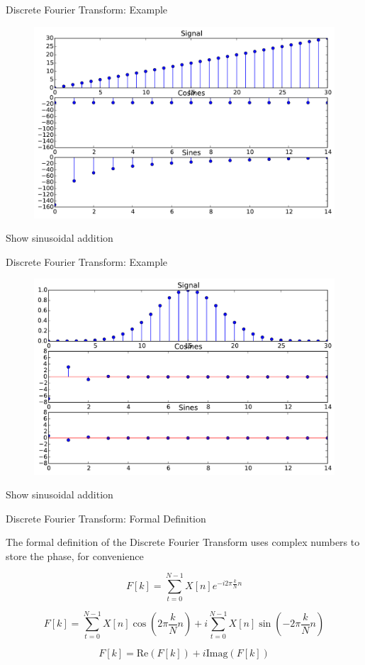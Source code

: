 \documentclass{beamer}
\begin{document}
\begin{frame}{Discrete Fourier Transform: Example}

\begin{figure}[t]
    \includegraphics[width=\textwidth]{SawtoothWave.pdf}
\end{figure}

Show sinusoidal addition

\end{frame}

\begin{frame}{Discrete Fourier Transform: Example}

\begin{figure}[t]
    \includegraphics[width=\textwidth]{GaussianBump.pdf}
\end{figure}

Show sinusoidal addition
\end{frame}

\begin{frame}{Discrete Fourier Transform: Formal Definition}

The formal definition of the Discrete Fourier Transform uses complex numbers to store the phase, for convenience

\[ F[k] = \sum_{t = 0}^{N-1} X[n] e^{ -i 2 \pi \frac{k}{N} n } \]

\[ F[k] = \sum_{t = 0}^{N-1} X[n] \cos \left( 2 \pi \frac{k}{N} n \right) + i \sum_{t = 0}^{N-1} X[n] \sin \left( -2 \pi \frac{k}{N} n \right)  \]

\[ F[k] = \text{Re}(F[k]) + i \text{Imag}(F[k]) \]

\end{frame}
\end{document}
